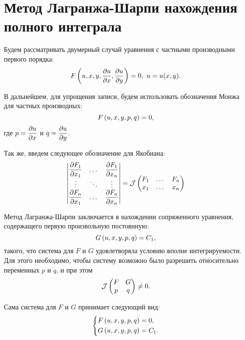 \section{Метод Лагранжа-Шарпи нахождения полного интеграла}

	Будем рассматривать двумерный случай уравнения с частными производными первого порядка:
	\[ F \left( u, x, y, \dfrac{\partial u}{\partial x}, \dfrac{\partial u}{\partial y} \right) = 0, ~ u = u(x, y). \]

	В дальнейшем, для упрощения записи, будем использовать обозначения Монжа для частных производных:
	\[ F \left( u, x, y, p, q \right) = 0, \]
	где $p = \dfrac{\partial u}{\partial x}$ и $q = \dfrac{\partial u}{\partial y}$.

	Так же, введем следующее обозначение для Якобиана:
	\[ \begin{vmatrix}
		\dfrac{\partial F_1}{\partial x_1} & \dots & \dfrac{\partial F_1}{\partial x_n} \\
		\vdots & \ddots & \vdots \\
		\dfrac{\partial F_n}{\partial x_1} & \dots & \dfrac{\partial F_n}{\partial x_n}
	\end{vmatrix} = \mathcal{J} \left( \begin{matrix} F_1 & \dots & F_n \\ x_1 & \dots & x_n \end{matrix} \right) \]

	Метод Лагранжа-Шарпи заключается в нахождении сопряженного уравнения, содержащего первую произвольную постоянную:
	\[ G \left( u, x, y, p, q \right) = C_1, \]
	такого, что система для $F$ и $G$ удовлетворяла условию вполне интегрируемости. Для этого необходимо, чтобы систему возможно было разрешить относительно переменных $p$ и $q$, и при этом
	\[ \mathcal{J} \left( \begin{matrix} F & G \\ p & q \end{matrix} \right) \neq 0. \]

	Сама система для $F$ и $G$ принимает следующий вид:
	\[ \left\lbrace \begin{split} F \left( u, x, y, p, q \right) &= 0, \\ G \left( u, x, y, p, q \right) &= C_1. \end{split} \right. \]

